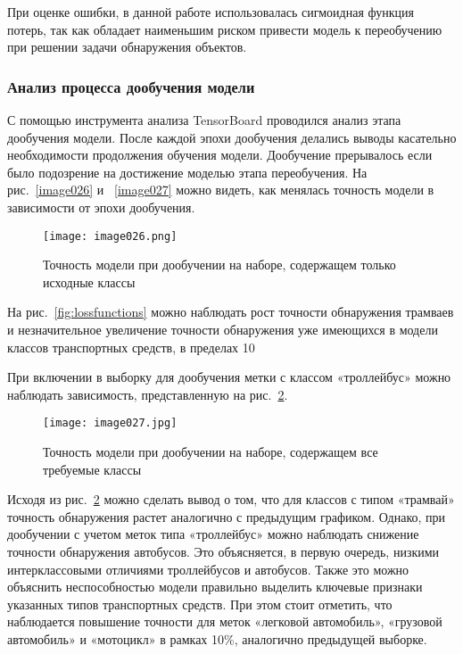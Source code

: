 При оценке ошибки, в данной работе использовалась сигмоидная функция потерь, так как обладает наименьшим риском привести модель к переобучению при решении задачи обнаружения объектов. 

\subsubsection{Анализ процесса дообучения модели}

С помощью инструмента анализа TensorBoard проводился анализ этапа дообучения модели. После каждой эпохи дообучения делались выводы касательно необходимости продолжения обучения модели. Дообучение прерывалось если было подозрение на достижение моделью этапа переобучения. На рис.~\ref{image026} и ~\ref{image027} можно видеть, как менялась точность модели в зависимости от эпохи дообучения.

\begin{figure}[htbp]
\centering
\texttt{[image: image026.png]}
\caption{Точность модели при дообучении на наборе, содержащем только исходные классы}%
\label{fig:image026}
\end{figure}

На рис.~\ref{fig:lossfunctions} можно наблюдать рост точности обнаружения трамваев и незначительное увеличение точности обнаружения уже имеющихся в модели классов транспортных средств, в пределах 10%

При включении в выборку для дообучения метки с классом «троллейбус» можно наблюдать зависимость, представленную на рис.~\ref{fig:image027}.

\begin{figure}[htbp]
\centering
\texttt{[image: image027.jpg]}
\caption{Точность модели при дообучении на наборе, содержащем все требуемые классы}%
\label{fig:image027}
\end{figure}

Исходя из рис.~\ref{fig:image027} можно сделать вывод о том, что для классов с типом «трамвай» точность обнаружения растет аналогично с предыдущим графиком. Однако, при дообучении с учетом меток типа «троллейбус» можно наблюдать снижение точности обнаружения автобусов. Это объясняется, в первую очередь, низкими интерклассовыми отличиями троллейбусов и автобусов. Также это можно объяснить неспособностью модели правильно выделить ключевые признаки указанных типов транспортных средств. При этом стоит отметить, что наблюдается повышение точности для меток «легковой автомобиль», «грузовой автомобиль» и «мотоцикл» в рамках 10\%, аналогично предыдущей выборке. 

